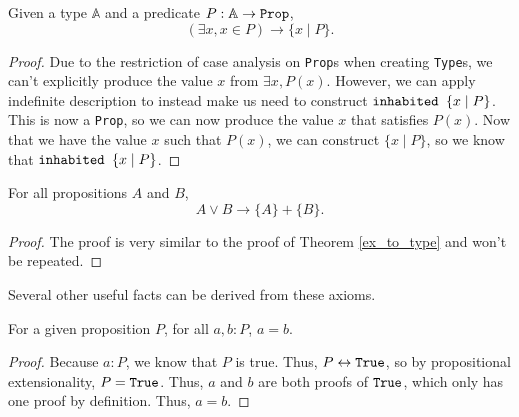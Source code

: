\documentclass[../../math.tex]{subfiles}
\begin{document}
\begin{theorem} \label{ex_to_type}
    Given a type $\mathbb A$ and a predicate $P : \mathbb A \rightarrow
    \verb|Prop|$,
    \[
        (\exists x, x \in P) \rightarrow \{x \mid P\}.
    \]
\end{theorem}
\begin{proof}
    Due to the restriction of case analysis on \verb|Prop|s when creating
    \verb|Type|s, we can't explicitly produce the value $x$ from $\exists x,
    P(x)$.  However, we can apply indefinite description to instead make us
    need to construct $\verb|inhabited | \{x \mid P\}$.  This is now a
    \verb|Prop|, so we can now produce the value $x$ that satisfies $P(x)$.  Now
    that we have the value $x$ such that $P(x)$, we can construct $\{x \mid
    P\}$, so we know that $\verb|inhabited | \{x \mid P\}$.
\end{proof}

\begin{theorem} \label{or_to_strong}
    For all propositions $A$ and $B$,
    \[
        A \vee B \rightarrow \{A\} + \{B\}.
    \]
\end{theorem}
\begin{proof}
    The proof is very similar to the proof of Theorem \ref{ex_to_type} and won't
    be repeated.
\end{proof}

Several other useful facts can be derived from these axioms.

\begin{theorem}
    For a given proposition $P$, for all $a, b : P$, $a = b$.
\end{theorem}
\begin{proof}
    Because $a : P$, we know that $P$ is true.  Thus, $P \leftrightarrow \True$,
    so by propositional extensionality, $P = \True$.  Thus, $a$ and $b$ are both
    proofs of $\True$, which only has one proof by definition.  Thus, $a = b$.
\end{proof}
\end{document}
